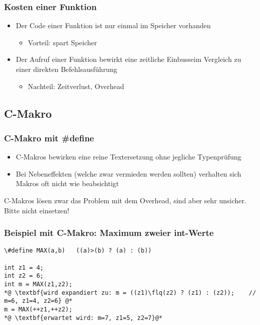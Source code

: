 \subsubsection{Kosten einer Funktion\hfill}
\label{sec:Kosten einer Funktion}
\begin{itemize}
	\item Der Code einer Funktion ist nur einmal im Speicher vorhanden
	\begin{itemize}
		\item Vorteil: spart Speicher
	\end{itemize}
	\item Der Aufruf einer Funktion bewirkt eine zeitliche Einbusseim Vergleich zu einer direkten Befehlsausführung
	\begin{itemize}
		\item Nachteil: Zeitverlust, Overhead
	\end{itemize}
\end{itemize}


\subsection{C-Makro\hfill}
\label{sec:C-Makro}

\subsubsection{C-Makro mit {\#define}\hfill}
\label{sec:C-Makro mit define}
\begin{itemize}
	\item C-Makros bewirken eine reine Textersetzung ohne jegliche Typenprüfung
	\item Bei Nebeneffekten (welche zwar vermieden werden sollten) verhalten sich Makros oft nicht wie beabsichtigt
\end{itemize}
\begin{achtung}	%
C-Makros lösen zwar das Problem mit dem Overhead, sind aber sehr unsicher. Bitte nicht einsetzen!
\end{achtung}


\subsubsection{Beispiel mit C-Makro: Maximum zweier int-Werte\hfill}
\label{sec:Beispiel mit C-Makro: Maximum zweier int-Werte}
\noindent
\begin{minipage}{\linewidth}
\begin{lstlisting}
\#define MAX(a,b)	((a)>(b) ? (a) : (b))

int z1 = 4;
int z2 = 6;
int m = MAX(z1,z2);
*@ \textbf{wird expandiert zu: m = ((z1)\flq(z2) ? (z1) : (z2));	// m=6, z1=4, z2=6} @*
m = MAX(++z1,++z2);
*@ \textbf{erwartet wird: m=7, z1=5, z2=7}@*
\end{lstlisting}
\end{minipage}


